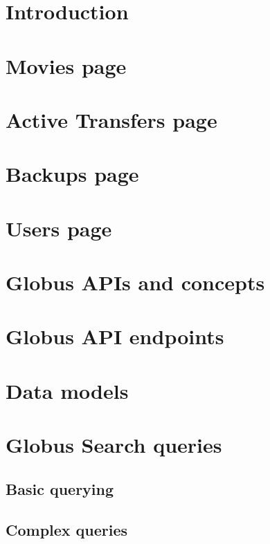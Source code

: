 \documentclass{report}
\begin{document}
\maketitle
\tableofcontents

\chapter{Introduction}


\chapter{Movies page}


\chapter{Active Transfers page}


\chapter{Backups page}


\chapter{Users page}


\appendix

\chapter{Globus APIs and concepts}


\chapter{Globus API endpoints\label{appendix:globusapis}}


\chapter{Data models}


\chapter{Globus Search queries}
\section{Basic querying}
\section{Complex queries}
\end{document}
